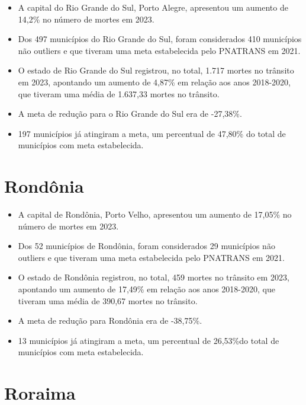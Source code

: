 \documentclass[
  letterpaper,
  DIV=11,
  numbers=noendperiod]{scrreprt}
\begin{document}
\begin{itemize}
\item
  A capital do Rio Grande do Sul, Porto Alegre, apresentou um aumento de
  14,2\% no número de mortes em 2023.
\item
  Dos 497 municípios do Rio Grande do Sul, foram considerados 410
  municípios não outliers e que tiveram uma meta estabelecida pelo
  PNATRANS em 2021.
\item
  O estado de Rio Grande do Sul registrou, no total, 1.717 mortes no
  trânsito em 2023, apontando um aumento de 4,87\% em relação aos anos
  2018-2020, que tiveram uma média de 1.637,33 mortes no trânsito.
\item
  A meta de redução para o Rio Grande do Sul era de -27,38\%.
\item
  197 municípios já atingiram a meta, um percentual de 47,80\% do total
  de municípios com meta estabelecida.
\end{itemize}

\section{Rondônia}\label{ronduxf4nia}

\begin{itemize}
\item
  A capital de Rondônia, Porto Velho, apresentou um aumento de 17,05\%
  no número de mortes em 2023.
\item
  Dos 52 municípios de Rondônia, foram considerados 29 municípios não
  outliers e que tiveram uma meta estabelecida pelo PNATRANS em 2021.
\item
  O estado de Rondônia registrou, no total, 459 mortes no trânsito em
  2023, apontando um aumento de 17,49\% em relação aos anos 2018-2020,
  que tiveram uma média de 390,67 mortes no trânsito.
\item
  A meta de redução para Rondônia era de -38,75\%.
\item
  13 municípios já atingiram a meta, um percentual de 26,53\%do total de
  municípios com meta estabelecida.
\end{itemize}

\section{Roraima}\label{roraima}
\end{document}
